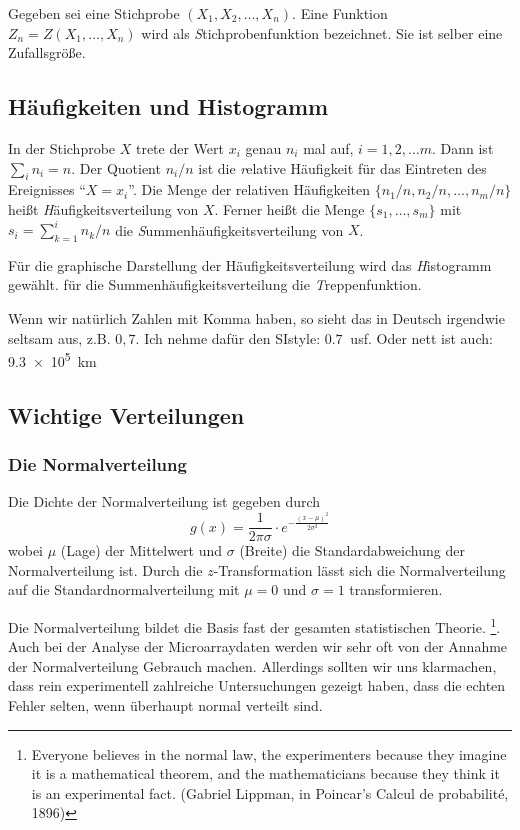 Gegeben sei eine Stichprobe $(X_1,X_2,\ldots,X_n)$. Eine Funktion $Z_n=Z(X_1,\ldots,X_n)$ wird als {\textit Stichprobenfunktion} bezeichnet. Sie ist selber eine Zufallsgröße.

\subsection{Häufigkeiten und Histogramm}
In der Stichprobe $X$ trete der Wert $x_i$ genau $n_i$ mal auf, $i=1,2,\ldots m$. Dann ist $\sum_i n_i = n$. Der Quotient $n_i/n$ ist die {\textit relative Häufigkeit} für das Eintreten des Ereignisses ``$X=x_i$''.
Die Menge der relativen Häufigkeiten $\{n_1/n,n_2/n,\ldots, n_m/n\}$ heißt {\textit Häufigkeitsverteilung} von $X$. Ferner heißt die Menge $\{s_1,\ldots,s_m\}$ mit $s_i=\sum_{k=1}^{i}n_k/n$ die {\textit Summenhäufigkeitsverteilung} von $X$.

Für die graphische Darstellung der Häufigkeitsverteilung wird das {\textit Histogramm} gewählt. für die Summenhäufigkeitsverteilung die {\textit Treppenfunktion}.

Wenn wir natürlich Zahlen mit Komma haben, so sieht das in Deutsch irgendwie seltsam aus, z.B. $0,7$. Ich nehme dafür den SIstyle: $\SI{0,7}{}$ usf.  Oder nett ist auch: \SI{9.3e5}{km}


%
\subsection{Wichtige Verteilungen}

\subsubsection{Die Normalverteilung}
Die Dichte der Normalverteilung ist gegeben durch
\begin{equation}\label{eqn:dichtenormal}
g(x) = \frac{1}{2\pi\sigma}\cdot e^{-\frac{(x-\mu)^2}{2\sigma^2}}
\end{equation}
wobei $\mu$ (Lage) der Mittelwert und $\sigma$ (Breite) die Standardabweichung der Normalverteilung ist. 
Durch die $z$-Transformation lässt sich die Normalverteilung auf die Standardnormalverteilung mit $\mu=0$ und $\sigma=1$ transformieren.

Die Normalverteilung bildet die Basis fast der gesamten statistischen Theorie. \footnote{ 
	\glqq Everyone believes in the normal law, the experimenters because they imagine it is a mathematical theorem, and the mathematicians because they think it is an experimental fact.\grqq{} (Gabriel Lippman, in Poincar's Calcul de probabilité, 1896)}. Auch bei der Analyse der Microarraydaten werden wir sehr oft von der Annahme der Normalverteilung Gebrauch machen. Allerdings sollten wir uns klarmachen, dass  rein experimentell zahlreiche Untersuchungen gezeigt haben, dass die echten Fehler selten, wenn überhaupt normal verteilt sind.


